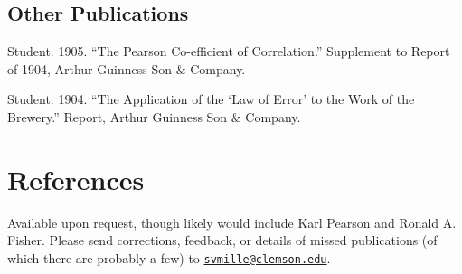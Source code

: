 \documentclass[11pt,]{article}
\begin{document}
\subsection{Other Publications}\label{other-publications}

Student. 1905. ``The Pearson Co-efficient of Correlation.'' Supplement
to Report of 1904, Arthur Guinness Son \& Company.

Student. 1904. ``The Application of the `Law of Error' to the Work of
the Brewery.'' Report, Arthur Guinness Son \& Company.

\section{References}\label{references}

Available upon request, though likely would include Karl Pearson and
Ronald A. Fisher. Please send corrections, feedback, or details of
missed publications (of which there are probably a few) to
\href{mailto:svmille@clemson.edu}{\nolinkurl{svmille@clemson.edu}}.
\end{document}

